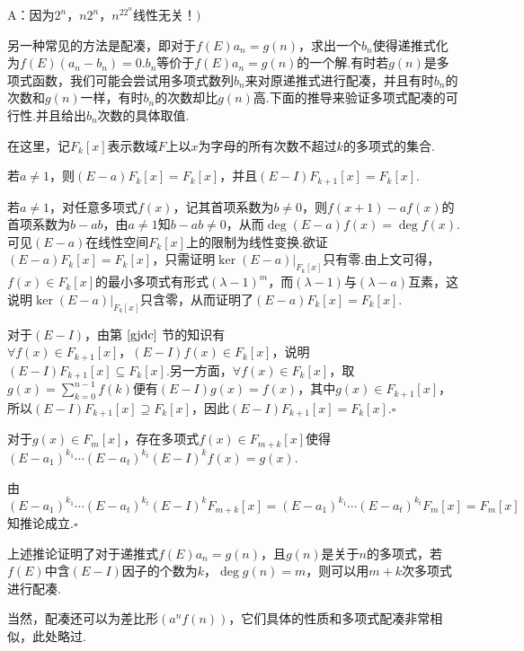 \documentclass[10pt]{article}
\newcommand*{\QEDB}{\hfill\ensuremath{\square}}  %
\newcommand*{\D}{\text{，}}
\newcommand*{\SL}{\sum\limits}
\numberwithin{equation}{section}
\begin{document}
A：因为$2^n\D n2^n \D n^22^n${\zhht 线性无关}！$)$
\par 另一种常见的方法是配凑，即对于$f(E)a_n = g(n)$，求出一个$b_n$使得递推式化为$f(E)(a_n-b_n) = 0$.$b_n$等价于$f(E)a_n = g(n)$的一个解.有时若$g(n)$是多项式函数，我们可能会尝试用多项式数列$b_n$来对原递推式进行配凑，并且有时$b_n$的次数和$g(n)$一样，有时$b_n$的次数却比$g(n)$高.下面的推导来验证多项式配凑的可行性.并且给出$b_n$次数的具体取值.
\par 在这里，记$F_k[x]$表示数域$F$上以$x$为字母的所有次数不超过$k$的多项式的集合.
\begin{YL}
    若$a \ne 1$，则$(E-a)F_k[x] = F_k[x]$，并且$(E-I)F_{k+1}[x] = F_{k}[x]$.
\end{YL}
\begin{ZM}
    若$a \ne 1$，对任意多项式$f(x)$，记其首项系数为$b \ne 0$，则$f(x+1)-af(x)$的首项系数为$b-ab$，由$a \ne 1$知$b-ab \ne 0$，从而$\deg (E-a)f(x) = \deg f(x)$.可见$(E-a)$在线性空间$F_k[x]$上的限制为线性变换.欲证$(E-a)F_k[x] = F_k[x]$，只需证明$\ker (E-a)|_{F_k[x]}$只有零.由上文可得，$f(x) \in F_k[x]$的最小多项式有形式$(\lambda - 1)^m$，而$(\lambda - 1)$与$(\lambda - a)$互素，这说明$\ker (E-a)|_{F_k[x]}$只含零，从而证明了$(E-a)F_k[x] = F_k[x]$.
    \par 对于$(E-I)$，由第 $\ref{gjdc}$ 节的知识有$\forall f(x) \in F_{k+1}[x]\D (E-I)f(x) \in F_{k}[x]$，说明$(E-I)F_{k+1}[x] \subseteq F_{k}[x]$.另一方面，$\forall f(x) \in F_k[x]$，取$g(x)=\SL_{k=0}^{n-1}{f(k)}$便有$(E-I)g(x) = f(x)$，其中$g(x) \in F_{k+1}[x]$，所以$(E-I)F_{k+1}[x] \supseteq F_{k}[x]$，因此$(E-I)F_{k+1}[x] = F_k[x]$.\QEDB
\end{ZM}
\begin{TL}
    对于$g(x) \in F_m[x]$，存在多项式$f(x) \in F_{m+k}[x]$使得$(E-a_1)^{k_1} \cdots (E-a_t)^{k_t}(E-I)^kf(x) = g(x)$.
\end{TL}
\begin{ZM}
    由$(E-a_1)^{k_1}\cdots (E-a_t)^{k_t}(E-I)^k F_{m+k}[x] =(E-a_1)^{k_1}\cdots (E-a_t)^{k_t}F_m[x] = F_m[x]$知推论成立.\QEDB
\end{ZM}
上述推论证明了对于递推式$f(E)a_n = g(n)$，且$g(n)$是关于$n$的多项式，若$f(E)$中含$(E-I)$因子的个数为$k$，$\deg g(n) = m$，则可以用$m+k$次多项式进行配凑.
\par 当然，配凑还可以为差比形$(a^nf(n))$，它们具体的性质和多项式配凑非常相似，此处略过.
\end{document}
